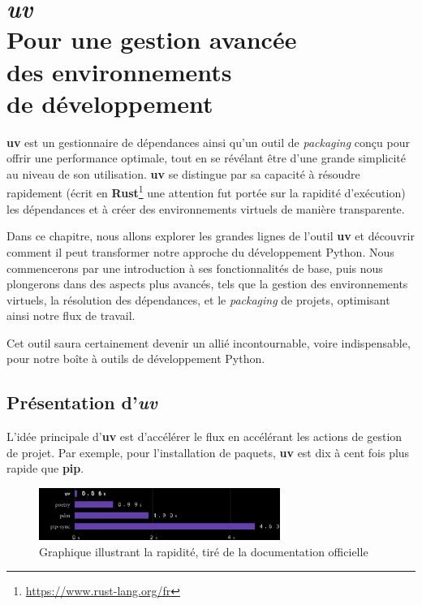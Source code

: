 \chapter[\textit{uv}]{\textit{uv} \\ Pour une gestion avancée \\ des environnements \\ de développement}

\bigskip

\textbf{uv} est un gestionnaire de dépendances ainsi qu'un outil de \textit{packaging} conçu pour offrir une performance optimale, tout en se révélant être d'une grande simplicité au niveau de son utilisation. \textbf{uv} se distingue par sa capacité à résoudre rapidement (écrit en \textbf{Rust}\footnote{\url{https://www.rust-lang.org/fr}} une attention fut portée sur la rapidité d'exécution) les dépendances et à créer des environnements virtuels de manière transparente.

Dans ce chapitre, nous allons explorer les grandes lignes de l'outil \textbf{uv} et découvrir comment il peut transformer notre approche du développement Python. Nous commencerons par une introduction à ses fonctionnalités de base, puis nous plongerons dans des aspects plus avancés, tels que la gestion des environnements virtuels, la résolution des dépendances, et le \textit{packaging} de projets, optimisant ainsi notre flux de travail.

Cet outil saura certainement devenir un allié incontournable, voire indispensable, pour notre boîte à outils de développement Python.

\section{Présentation d'\textit{uv}}
L'idée principale d'\textbf{uv} est d'accélérer le flux en accélérant les actions de gestion de projet. Par exemple, pour l'installation de paquets, \textbf{uv} est dix à cent fois plus rapide que \textbf{pip}.

\begin{figure}[h!]
    \centering
    \includegraphics[width=0.7\textwidth]{IMG/uv_graph.png} %
    \caption{Graphique illustrant la rapidité, tiré de la documentation officielle}
\end{figure}

